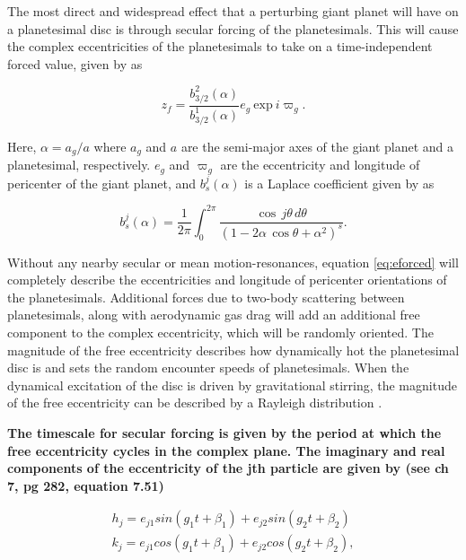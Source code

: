 \documentclass[fleqn,usenatbib]{mnras}
\begin{document}
The most direct and widespread effect that a perturbing giant planet will have on a planetesimal disc is through secular forcing of the planetesimals. This will 
cause the complex eccentricities of the planetesimals to take on a time-independent 
forced value, given by \citep{1999ApJ...527..918W} as

\begin{equation}\label{eq:eforced}
	z_{f} = \frac{b^{2}_{3/2} (\alpha)}{b^{1}_{3/2} (\alpha)} e_{g} ~ \mathrm{exp} ~ i \varpi_{g}.
\end{equation}

\noindent Here, $\alpha = a_{g} / a$ where $a_{g}$ and $a$ are the semi-major axes of the giant planet and a planetesimal, 
respectively. $e_{g}$ and $\varpi_{g}$ are the eccentricity and
longitude of pericenter of the giant planet, and $b^{j}_{s} (\alpha)$ is a 
Laplace coefficient given by \citep{1999ssd..book.....M} as

\begin{equation}\label{eq:lap}
	b_{s}^{j}(\alpha) = \frac{1}{2 \pi} \int_{0}^{2 \pi} \frac{\cos \, j \theta \, d \theta}{\left( 1 - 2 \alpha \, \cos \theta + \alpha^2 \right)^{s}}.
\end{equation}

Without any nearby secular or mean motion-resonances, equation \ref{eq:eforced} will completely describe the eccentricities and longitude of  
pericenter orientations of the planetesimals. Additional forces due to two-body scattering between planetesimals, along with 
aerodynamic gas drag will add an additional free component to the complex eccentricity, which will be randomly oriented. The 
magnitude of the free eccentricity describes how dynamically hot the planetesimal disc is and sets the random encounter speeds of 
planetesimals. When the dynamical excitation of the disc is driven by gravitational stirring, the magnitude of the free eccentricity can 
be described by a Rayleigh distribution \citep{1992Icar...96..107I}.

\textbf{The timescale for secular forcing is given by the period at which the free eccentricity cycles in the complex plane. The imaginary and real components of the eccentricity of the jth particle are given by \citet{1999ssd..book.....M} (see ch 7, pg 282, equation 7.51)}

\begin{eqnarray}\label{eq:kandh}
	h_{j} = e_{j1} sin (g_{1} t + \beta_{1}) + e_{j2} sin (g_{2} t + \beta_{2}) \\ \nonumber
	k_{j} = e_{j1} cos (g_{1} t + \beta_{1}) + e_{j2} cos (g_{2} t + \beta_{2}),
\end{eqnarray}
\end{document}
